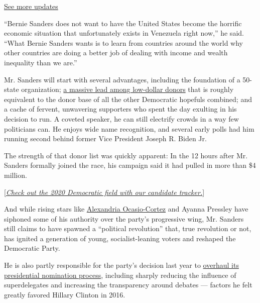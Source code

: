 \href{https://www.nytimes.com/2020/07/31/us/elections/biden-vs-trump.html?action=click\&pgtype=Article\&state=default\&region=MAIN_CONTENT_1\&context=storylines_live_updates}{See
more updates}

``Bernie Sanders does not want to have the United States become the
horrific economic situation that unfortunately exists in Venezuela right
now,'' he said. ``What Bernie Sanders wants is to learn from countries
around the world why other countries are doing a better job of dealing
with income and wealth inequality than we are.''

Mr. Sanders will start with several advantages, including the foundation
of a 50-state organization;
\href{https://www.nytimes.com/2019/02/09/us/politics/2020-democrats-campaign-funding.html}{a
massive lead among low-dollar donors} that is roughly equivalent to the
donor base of all the other Democratic hopefuls combined; and a cache of
fervent, unwavering supporters who spent the day exulting in his
decision to run. A coveted speaker, he can still electrify crowds in a
way few politicians can. He enjoys wide name recognition, and several
early polls had him running second behind former Vice President Joseph
R. Biden Jr.

The strength of that donor list was quickly apparent: In the 12 hours
after Mr. Sanders formally joined the race, his campaign said it had
pulled in more than \$4 million.

{[}\href{https://www.nytimes.com/interactive/2019/us/politics/2020-presidential-candidates.html?action=click\&module=Intentional\&pgtype=Article}{\emph{Check
out the 2020 Democratic field with our candidate tracker.}}{]}

And while rising stars like
\href{https://www.nytimes.com/2019/01/13/nyregion/ocasio-cortez-democrats-congress.html}{Alexandria
Ocasio-Cortez} and Ayanna Pressley have siphoned some of his authority
over the party's progressive wing, Mr. Sanders still claims to have
spawned a ``political revolution'' that, true revolution or not, has
ignited a generation of young, socialist-leaning voters and reshaped the
Democratic Party.

He is also partly responsible for the party's decision last year to
\href{https://www.nytimes.com/2018/08/25/us/politics/superdelegates-democrats-dnc.html}{overhaul
its presidential nomination process}, including sharply reducing the
influence of superdelegates and increasing the transparency around
debates --- factors he felt greatly favored Hillary Clinton in 2016.

